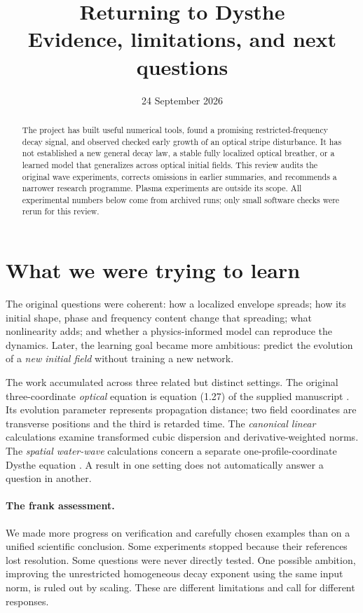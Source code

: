 \documentclass[11pt]{article}
\title{Returning to Dysthe\\\large Evidence, limitations, and next questions}
\author{}
\date{24 September 2026}
\begin{document}
\maketitle
\vspace{-1.5em}
\begin{abstract}
The project has built useful numerical tools, found a promising restricted-frequency decay signal, and observed checked early growth of an optical stripe disturbance. It has not established a new general decay law, a stable fully localized optical breather, or a learned model that generalizes across optical initial fields. This review audits the original wave experiments, corrects omissions in earlier summaries, and recommends a narrower research programme. Plasma experiments are outside its scope. All experimental numbers below come from archived runs; only small software checks were rerun for this review.
\end{abstract}

\section{What we were trying to learn}
The original questions were coherent: how a localized envelope spreads; how its initial shape, phase and frequency content change that spreading; what nonlinearity adds; and whether a physics-informed model can reproduce the dynamics. Later, the learning goal became more ambitious: predict the evolution of a \emph{new initial field} without training a new network.

The work accumulated across three related but distinct settings. The original three-coordinate \emph{optical} equation is equation (1.27) of the supplied manuscript \cite{MPS}. Its evolution parameter represents propagation distance; two field coordinates are transverse positions and the third is retarded time. The \emph{canonical linear} calculations examine transformed cubic dispersion and derivative-weighted norms. The \emph{spatial water-wave} calculations concern a separate one-profile-coordinate Dysthe equation \cite{FD}. A result in one setting does not automatically answer a question in another.

\paragraph{The frank assessment.}
We made more progress on verification and carefully chosen examples than on a unified scientific conclusion. Some experiments stopped because their references lost resolution. Some questions were never directly tested. One possible ambition, improving the unrestricted homogeneous decay exponent using the same input norm, is ruled out by scaling. These are different limitations and call for different responses.
\end{document}

